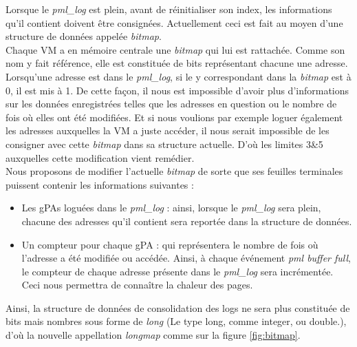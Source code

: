 Lorsque le \textit{pml\_log} est plein, avant de réinitialiser son index, les informations qu'il contient doivent être consignées. Actuellement ceci est fait au moyen d'une structure de données appelée \textit{bitmap}.\\
Chaque VM a en mémoire centrale une \textit{bitmap} qui lui est rattachée. Comme son nom y fait référence, elle est constituée de bits représentant chacune une adresse. Lorsqu'une adresse est dans le \textit{pml\_log}, si le y correspondant dans la \textit{bitmap} est à 0, il est mis à 1. De cette façon, il nous est impossible d'avoir plus d'informations sur les données enregistrées telles que les adresses en question ou le nombre de fois où elles ont été modifiées. Et si nous voulions par exemple loguer également les adresses auxquelles la VM a juste accéder, il nous serait impossible de les consigner avec cette \textit{bitmap} dans sa structure actuelle. D'où les limites 3\&5 auxquelles cette modification vient remédier.\\
Nous proposons de modifier l'actuelle \textit{bitmap} de sorte que ses feuilles terminales puissent contenir les informations suivantes :
\begin{itemize}
    \item Les gPAs loguées dans le \textit{pml\_log} : ainsi, lorsque le \textit{pml\_log} sera plein, chacune des adresses qu'il contient sera reportée dans la structure de données.
    \item Un compteur pour chaque gPA : qui représentera le nombre de fois où l'adresse a été modifiée ou accédée. Ainsi, à chaque événement \textit{pml buffer full}, le compteur de chaque adresse présente dans le \textit{pml\_log} sera incrémentée. Ceci nous permettra de connaître la chaleur des pages.
\end{itemize}

\noindent Ainsi, la structure de données de consolidation des logs ne sera plus constituée de bits mais nombres sous forme de \textit{long} (Le type long, comme integer, ou double.), d'où la nouvelle appellation \textit{longmap} comme sur la figure \ref{fig:bitmap}.

